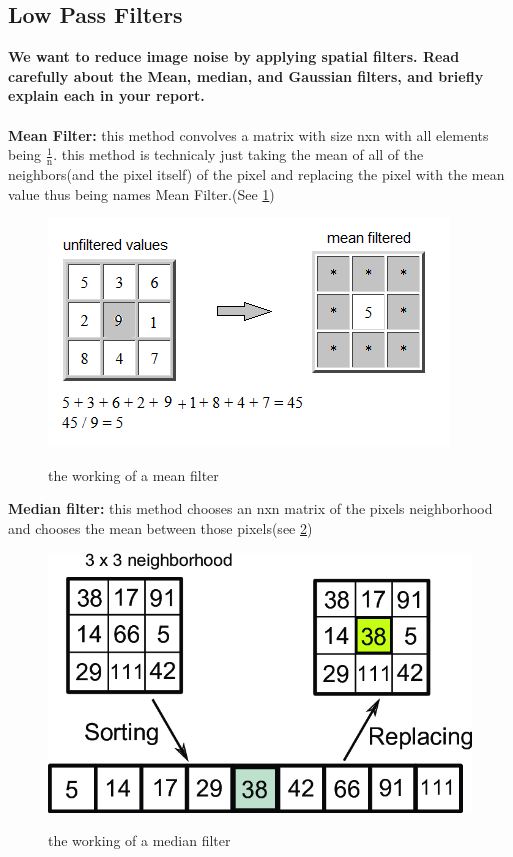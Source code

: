 \documentclass[11pt]{article}
\begin{document}
\subsection{Low Pass Filters} 
\textbf{We want to reduce image noise by applying spatial filters. Read carefully about the Mean,
median, and Gaussian filters, and briefly explain each in your report.} \\
\vspace{5pt} \\
\textbf{Mean Filter:} this method convolves a matrix with size nxn
with all elements being $\frac{1}{\mathrm{n}}$. this method is technicaly just
taking the mean of all of the neighbors(and the pixel itself) of the pixel and replacing the
pixel with the mean value thus being names Mean Filter.(See \ref{fig:MeanFlt}) \\
\begin{figure}[H]
    \begin{center}
        \includegraphics[scale=0.6]{Fig/Mean.filter.png}
        \label{fig:MeanFlt}
        \caption{the working of a mean filter}
    \end{center}
\end{figure}
\textbf{Median filter:} this method chooses an nxn matrix of the pixels neighborhood
and chooses the mean between those pixels(see \ref{fig:MedianFlt}) \\
\begin{figure}[H]
    \begin{center}
        \includegraphics[scale=0.35]{Fig/Median.filter.png}
        \label{fig:MedianFlt}
        \caption{the working of a median filter}
    \end{center}
\end{figure}
\end{document}
